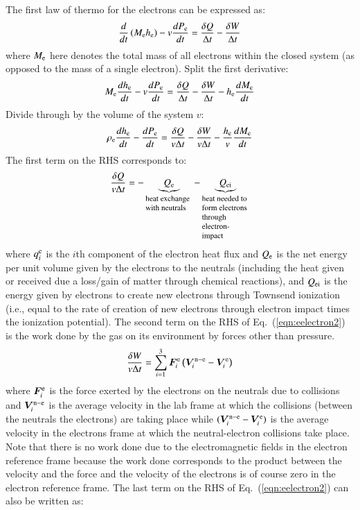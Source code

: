 \documentclass{warpdoc}
\renewcommand{\vec}[1]{\bm{#1}}
\begin{document}
The first law of thermo for the electrons can be expressed as:
%
\begin{equation}
 \frac{d }{d t}\left(M_{\rm e} h_{\rm e}\right) - v \frac{d P_{\rm e}}{dt} = \frac{\delta Q}{\Delta t}-\frac{\delta W}{\Delta t}
\end{equation}
%
where $M_{\rm e}$ here denotes the total mass of all electrons within the closed system (as opposed to the mass of a single electron).  Split the first derivative:
%
\begin{equation}
 M_{\rm e}\frac{d h_{\rm e}}{d t} - v \frac{d P_{\rm e}}{dt} = \frac{\delta Q}{\Delta t}-\frac{\delta W}{\Delta t}-h_{\rm e}\frac{d M_{\rm e}}{d t}
\end{equation}
%
Divide through by the volume of the system $v$:
%
\begin{equation}
\rho_{\rm e} \frac{d h_{\rm e}}{d t} -  \frac{d P_{\rm e}}{dt} = \frac{\delta Q}{v \Delta t}-\frac{\delta W}{v \Delta t}
-\frac{h_{\rm e}}{v}\frac{d M_{\rm e}}{d t}
\label{eqn:eelectron2}
\end{equation}
%  
The first term on the RHS corresponds to:
%
\begin{equation}
\frac{\delta Q}{v \Delta t}= 
-
\underbrace{
Q_{\rm e}
}_{\begin{minipage}{1.7cm}\flushleft \footnotesize heat exchange with neutrals\end{minipage}}
-
\underbrace{
Q_{\rm ei}
}_{\begin{minipage}{1.7cm}\flushleft \footnotesize heat needed to form electrons through electron-impact \end{minipage}}
\end{equation}
%
where $q^{\rm e}_i$ is the $i$th component of the electron heat flux and $Q_{\rm e}$ is the net energy per unit volume given by the electrons to the neutrals (including the heat given or received due a loss/gain of matter through chemical reactions), and $Q_{\rm ei}$ is the energy given by electrons to create new electrons through Townsend ionization (i.e., equal to the rate of creation of new electrons through electron impact times the ionization potential). The second term on the RHS of Eq.\ (\ref{eqn:eelectron2}) is the work done by the gas on its environment by forces other than pressure. 
%
\begin{equation}
\frac{\delta W}{v \Delta t}= \sum_{i=1}^3 \vec{F}_i^{\rm e} \left( \vec{V}_i^{{\rm n}-{\rm e}}-\vec{V}_i^{\rm e} \right)
\end{equation}
%
where $\vec{F}_i^{\rm e}$ is the force exerted by the electrons on the neutrals due to collisions and $\vec{V}_i^{{\rm n}-{\rm e}}$ is the average velocity in the lab frame at which the collisions (between the neutrals the electrons) are taking place while $(\vec{V}_i^{{\rm n}-{\rm e}}-\vec{V}_i^{\rm e})$ is the average velocity in the electrons frame at which the neutral-electron collisions take place. Note that there is no work done due to the electromagnetic fields in the electron reference frame because the work done corresponds to the product between the velocity and the force and the velocity of the electrons is of course zero in the electron reference frame.   The last term on the RHS of Eq.\ (\ref{eqn:eelectron2}) can also be written as:
\end{document}
